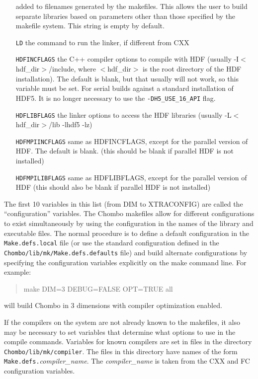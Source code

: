 \begin{itemize}
  added to filenames generated by the makefiles.  This allows the user to
  build separate libraries based on parameters other than those specified by the
  makefile system.  This string is empty by default.
\item[\tt LD] the command to run the linker, if different from CXX
\item[\tt HDFINCFLAGS] the C++ compiler options to compile with HDF
  (usually -I$<$hdf\_dir$>$/include, where $<$hdf\_dir$>$ is the root
  directory of the HDF installation).  The default is blank, but that usually
  will not work, so this variable must be set. For serial builds
  against a standard installation of HDF5. It is no longer necessary
  to use the {\tt -DH5\_USE\_16\_API} flag.
\item[\tt HDFLIBFLAGS] the linker options to access the HDF libraries
  (usually -L$<$hdf\_dir$>$/lib -lhdf5 -lz)
\item[\tt HDFMPIINCFLAGS] same as HDFINCFLAGS, except for the parallel
  version of HDF.  The default is blank. (this should be blank if parallel
  HDF is not installed) 
\item[\tt HDFMPILIBFLAGS] same as HDFLIBFLAGS, except for the parallel
  version of HDF (this should also be blank if parallel HDF is not
  installed)
\end{itemize}

The first 10 variables in this list (from DIM to XTRACONFIG) are called the
``configuration'' variables.  The Chombo makefiles allow for different configurations
to exist simultaneously by using the configuration in the names of the library 
and executable files.  The normal procedure is to define a default configuration
in the {\tt Make.defs.local} file (or use the standard configuration defined in the
{\tt Chombo/lib/mk/Make.defs.defaults} file) and build alternate configurations by
specifying the configuration variables explicitly on the make command line.  For example: 
\begin{quote}
make DIM=3 DEBUG=FALSE OPT=TRUE all
\end{quote}
will build Chombo in 3 dimensions with compiler optimization enabled.

If the compilers on the system are not already known to the makefiles, it
also may be necessary to set variables that determine what options to use in
the compile commands.  Variables for known compilers are set in files in the
directory {\tt Chombo/lib/mk/compiler}.  The files in this directory have names
of the form {\tt Make.defs.}{\em compiler\_name}.  The {\em compiler\_name} is taken
from the CXX and FC configuration variables.

